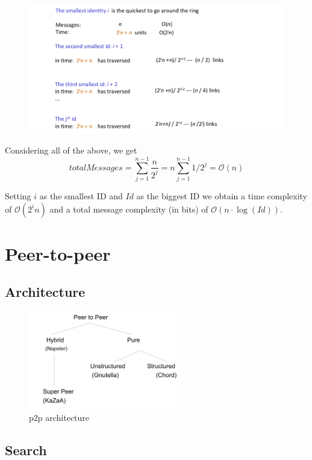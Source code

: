\documentclass[paper=a4, fontsize=11pt]{scrartcl} %
\numberwithin{equation}{section} %
\numberwithin{figure}{section} %
\numberwithin{table}{section} %
\begin{document}
\begin{figure}[H]
	\centering
	\includegraphics[width=\linewidth]{img/min_finding_ring}
	\caption{}
	\label{fig:minfindingring}
\end{figure}

Considering all of the above, we get $$totalMessages = \sum_{j = 1}^{n-1} \frac{n}{2^j}= n\sum_{j = 1}^{n-1}1/2^j = \mathcal{O}(n)$$ 

Setting $i$ as the smallest ID and $Id$ as the biggest ID we obtain a time complexity of $\mathcal{O}(2^in)$ and a total message complexity (in bits) of $\mathcal{O}(n\cdot \log(Id))$.



\section*{Peer-to-peer}
\subsection*{Architecture}
\begin{figure}[H]
  \centering
  \includegraphics[width=0.6\textwidth]{img/p2p.png}
  \caption{p2p architecture}
  
\end{figure}

\subsection*{Search}
\end{document}
